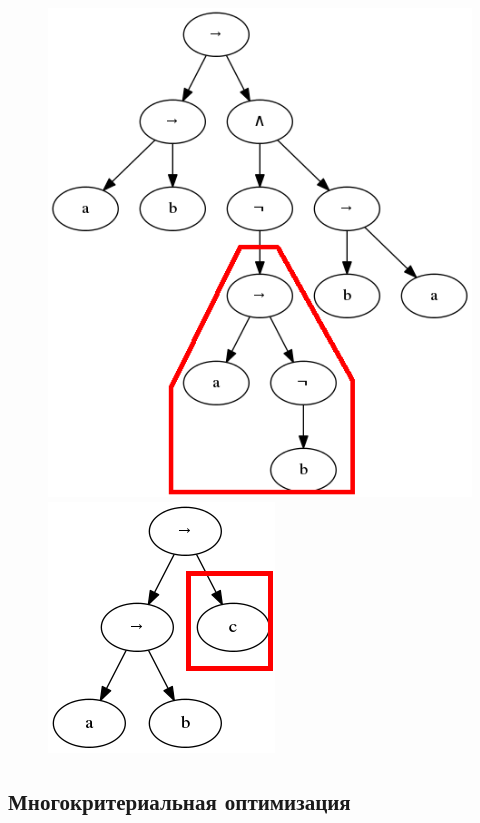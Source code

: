 \documentclass[12pt,fleqn]{article}
\begin{document}
\begin{figure}[!h]%
  \centering
  \begin{minipage}{2in}%
    \centering
    \includegraphics[scale=0.3]{t9.png}
  \end{minipage}%
  \qquad
  \begin{minipage}{2in}%
    \centering
    \includegraphics[scale=0.3]{t10.png}
  \end{minipage}%
\end{figure}

\FloatBarrier

\subsection{Многокритериальная оптимизация}
\end{document}
